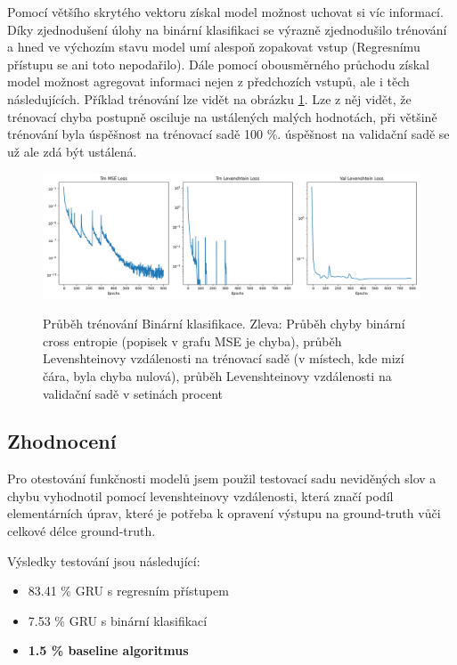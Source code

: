 \documentclass[a4paper]{article}
\theoremstyle{definition}
\begin{document}
Pomocí většího skrytého vektoru získal model možnost uchovat si víc informací. Díky zjednodušení úlohy na binární klasifikaci se výrazně zjednodušilo trénování a hned ve výchozím stavu model umí alespoň zopakovat vstup (Regresnímu přístupu se ani toto nepodařilo). Dále pomocí obousměrného průchodu získal model možnost agregovat informaci nejen z předchozích vstupů, ale i těch následujících. Příklad trénování lze vidět na obrázku \ref{png:graf_trenovani_new_gru}. Lze z něj vidět, že trénovací chyba postupně osciluje na ustálených malých hodnotách, při většině trénování byla úspěšnost na trénovací sadě 100 \%. úspěšnost na validační sadě se už ale zdá být ustálená.

\begin{figure}[t!]
  \centering
  \includegraphics[width=5in]{docs/torch_gru_256hid_2layers_bidirectional_yesbias_250batch_800epochs.png}\\[1pt]
  \caption{Průběh trénování Binární klasifikace. Zleva: Průběh chyby binární cross entropie (popisek v grafu MSE je chyba), průběh Levenshteinovy vzdálenosti na trénovací sadě (v místech, kde mizí čára, byla chyba nulová), průběh Levenshteinovy vzdálenosti na validační sadě v setinách procent}
  \label{png:graf_trenovani_new_gru}
\end{figure}

\subsection{Zhodnocení}
\label{subsec:zhodnoceni}

Pro otestování funkčnosti modelů jsem použil testovací sadu neviděných slov a chybu vyhodnotil pomocí levenshteinovy vzdálenosti, která značí podíl elementárních úprav, které je potřeba k opravení výstupu na ground-truth vůči celkové délce ground-truth.

Výsledky testování jsou následující:
\begin{itemize}
    \item 83.41 \% GRU s regresním přístupem
    \item 7.53 \%  GRU s binární klasifikací
    \item \textbf{1.5 \%   baseline algoritmus}
\end{itemize}
\end{document}
